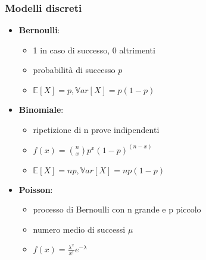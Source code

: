 \documentclass{beamer}
\begin{document}
\begin{frame}[fragile]
	\frametitle{Modelli discreti}

	\begin{itemize}
		\item \textbf{Bernoulli}: \begin{itemize}
			      \item 1 in caso di successo, 0 altrimenti
			      \item probabilità di successo $p$
			      \item $\mathbb{E}[X] = p, \mathbb{V}ar[X] = p\left(1-p\right)$
		      \end{itemize}
		\item \textbf{Binomiale}: \begin{itemize}
			      \item ripetizione di n prove indipendenti
			      \item $f(x) = \binom{n}{x} p^x (1-p)^(n-x)$
			      \item $\mathbb{E}[X] = n p, \mathbb{V}ar[X] = n p (1-p)$
		      \end{itemize}
		\item \textbf{Poisson}: \begin{itemize}
			      \item processo di Bernoulli con n grande e p piccolo
			      \item numero medio di successi $\mu$
			            \item$f(x) = \frac{\lambda^x}{x!} e^{-\lambda}$
		      \end{itemize}
	\end{itemize}
\end{frame}
\end{document}
